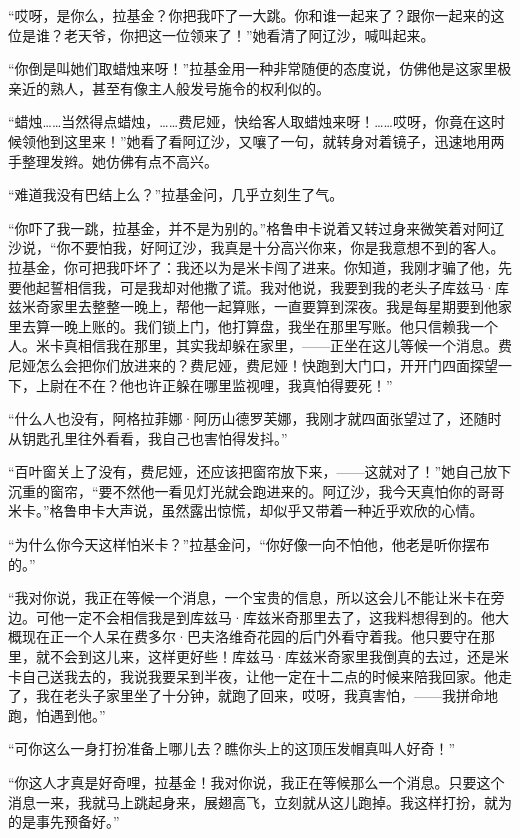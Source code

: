 \par “哎呀，是你么，拉基金？你把我吓了一大跳。你和谁一起来了？跟你一起来的这位是谁？老天爷，你把这一位领来了！”她看清了阿辽沙，喊叫起来。
\par “你倒是叫她们取蜡烛来呀！”拉基金用一种非常随便的态度说，仿佛他是这家里极亲近的熟人，甚至有像主人般发号施令的权利似的。
\par “蜡烛……当然得点蜡烛，……费尼娅，快给客人取蜡烛来呀！……哎呀，你竟在这时候领他到这里来！”她看了看阿辽沙，又嚷了一句，就转身对着镜子，迅速地用两手整理发辫。她仿佛有点不高兴。
\par “难道我没有巴结上么？”拉基金问，几乎立刻生了气。
\par “你吓了我一跳，拉基金，并不是为别的。”格鲁申卡说着又转过身来微笑着对阿辽沙说，“你不要怕我，好阿辽沙，我真是十分高兴你来，你是我意想不到的客人。拉基金，你可把我吓坏了：我还以为是米卡闯了进来。你知道，我刚才骗了他，先要他起誓相信我，可是我却对他撒了谎。我对他说，我要到我的老头子库兹马·库兹米奇家里去整整一晚上，帮他一起算账，一直要算到深夜。我是每星期要到他家里去算一晚上账的。我们锁上门，他打算盘，我坐在那里写账。他只信赖我一个人。米卡真相信我在那里，其实我却躲在家里，——正坐在这儿等候一个消息。费尼娅怎么会把你们放进来的？费尼娅，费尼娅！快跑到大门口，开开门四面探望一下，上尉在不在？他也许正躲在哪里监视哩，我真怕得要死！”
\par “什么人也没有，阿格拉菲娜·阿历山德罗芙娜，我刚才就四面张望过了，还随时从钥匙孔里往外看看，我自己也害怕得发抖。”
\par “百叶窗关上了没有，费尼娅，还应该把窗帘放下来，——这就对了！”她自己放下沉重的窗帘，“要不然他一看见灯光就会跑进来的。阿辽沙，我今天真怕你的哥哥米卡。”格鲁申卡大声说，虽然露出惊慌，却似乎又带着一种近乎欢欣的心情。
\par “为什么你今天这样怕米卡？”拉基金问，“你好像一向不怕他，他老是听你摆布的。”
\par “我对你说，我正在等候一个消息，一个宝贵的信息，所以这会儿不能让米卡在旁边。可他一定不会相信我是到库兹马·库兹米奇那里去了，这我料想得到的。他大概现在正一个人呆在费多尔·巴夫洛维奇花园的后门外看守着我。他只要守在那里，就不会到这儿来，这样更好些！库兹马·库兹米奇家里我倒真的去过，还是米卡自己送我去的，我说我要呆到半夜，让他一定在十二点的时候来陪我回家。他走了，我在老头子家里坐了十分钟，就跑了回来，哎呀，我真害怕，——我拼命地跑，怕遇到他。”
\par “可你这么一身打扮准备上哪儿去？瞧你头上的这顶压发帽真叫人好奇！”
\par “你这人才真是好奇哩，拉基金！我对你说，我正在等候那么一个消息。只要这个消息一来，我就马上跳起身来，展翅高飞，立刻就从这儿跑掉。我这样打扮，就为的是事先预备好。”
